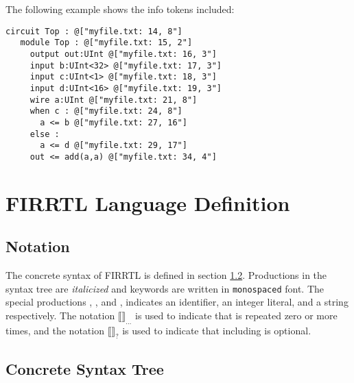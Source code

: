 \documentclass[12pt]{article}
\begin{document}
The following example shows the info tokens included:

\begin{lstlisting}
circuit Top : @["myfile.txt: 14, 8"] 
   module Top : @["myfile.txt: 15, 2"]
     output out:UInt @["myfile.txt: 16, 3"]
     input b:UInt<32> @["myfile.txt: 17, 3"]
     input c:UInt<1> @["myfile.txt: 18, 3"]
     input d:UInt<16> @["myfile.txt: 19, 3"]
     wire a:UInt @["myfile.txt: 21, 8"]
     when c : @["myfile.txt: 24, 8"]
       a <= b @["myfile.txt: 27, 16"]
     else :
       a <= d @["myfile.txt: 29, 17"]
     out <= add(a,a) @["myfile.txt: 34, 4"]
\end{lstlisting}

\section{FIRRTL Language Definition}
\newcommand{\pipe}{\textbar}
\newcommand{\opt}[1]{$\llbracket$#1$\rrbracket_?$}
\newcommand{\rpt}[1]{$\llbracket$#1$\rrbracket_{...}$}
\subsection{Notation}
The concrete syntax of FIRRTL is defined in section \ref{syntax_tree}. Productions in the syntax tree are {\em italicized} and keywords are written in \verb|monospaced| font. The special productions , , and , indicates an identifier, an integer literal, and a string respectively. The notation \rpt{} is used to indicate that  is repeated zero or more times, and the notation \opt{} is used to indicate that including  is optional.

\subsection{Concrete Syntax Tree} \label{syntax_tree}
\end{document}
